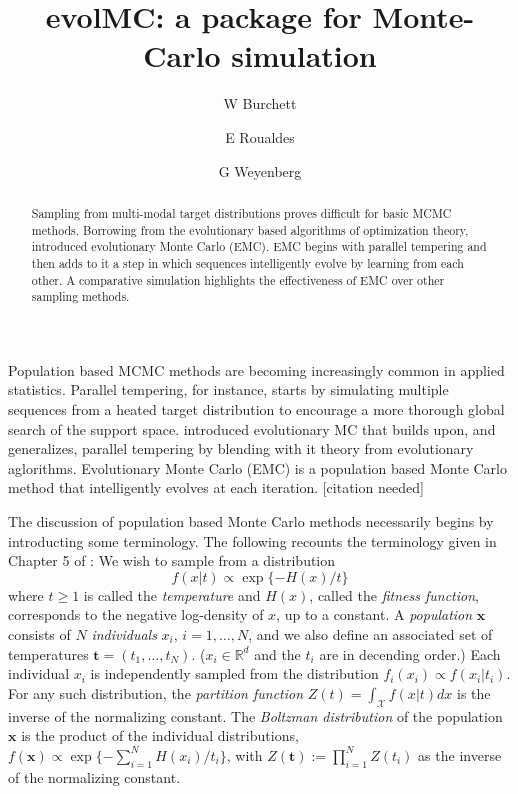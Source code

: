 \documentclass[12pt]{article}\usepackage[]{graphicx}\usepackage[]{color}
\title{evolMC: a package for Monte-Carlo simulation}
\author{W Burchett \and E Roualdes \and G Weyenberg}
\newcommand{\bx}{\mathbf x}
\newcommand{\bt}{\mathbf t}
\newcommand{\X}{\mathcal X}
\newcommand{\needcite}{{\color{red}[citation needed]}}
\begin{document}
\maketitle


\begin{abstract}
  Sampling from multi-modal target distributions proves difficult for
  basic MCMC methods.  Borrowing from the evolutionary based
  algorithms of optimization theory, \cite{liang2000evolutionary}
  introduced evolutionary Monte Carlo (EMC).  EMC begins with parallel
  tempering and then adds to it a step in which sequences
  intelligently evolve by learning from each other.  A comparative
  simulation highlights the effectiveness of EMC over other sampling
  methods.
\end{abstract}

\vspace{1cm}
\label{sec:introduction}

Population based MCMC methods are becoming increasingly common in
applied statistics.  Parallel tempering, for instance, starts by
simulating multiple sequences from a heated target distribution to
encourage a more thorough global search of the support space.
\cite{liang2000evolutionary} introduced evolutionary MC that builds
upon, and generalizes, parallel tempering by blending with it theory
from evolutionary aglorithms. Evolutionary Monte Carlo (EMC) is a
population based Monte Carlo method that intelligently evolves at each
iteration. \needcite

The discussion of population based Monte Carlo methods necessarily
begins by introducting some terminology. The following recounts the
terminology given in Chapter 5 of \cite{liang2011advanced}: We wish to
sample from a distribution \[f(x|t) \propto \exp\{ -H(x)/t \}\] where
$t\ge 1$ is called the \emph{temperature} and $H(x)$, called the
\emph{fitness function}, corresponds to the negative log-density of
$x$, up to a constant. A \emph{population} $\mathbf{x}$ consists of
$N$ \emph{individuals} $x_i$, $i = 1, \ldots, N$, and we also define
an associated set of temperatures $\bt = (t_1,\ldots,t_N)$. ($x_i \in
\mathbb{R}^d$ and the $t_i$ are in decending order.) Each individual
$x_i$ is independently sampled from the distribution $f_i(x_i) \propto
f(x_i|t_i)$.  For any such distribution, the \emph{partition function}
$Z(t)= \int_\X f(x|t) dx$ is the inverse of the normalizing
constant. The \emph{Boltzman distribution} of the population $\bx$ is the
product of the individual distributions, $f(\bx) \propto \exp \{ -\sum_{i=1}^N
H(x_i)/ t_i \}$, with $Z(\bt) := \prod_{i=1}^N Z(t_i)$ as the inverse
of the normalizing constant. 
\end{document}
